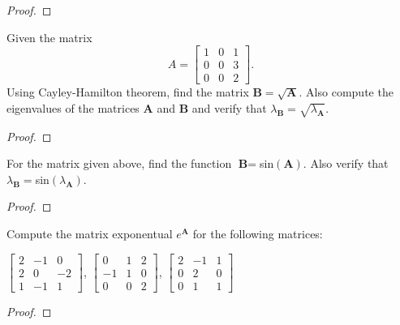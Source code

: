 \documentclass[conference,12pt,onecolumn,compsoc]{IEEEtran}
\begin{document}
\begin{exercise}

\end{exercise}
\begin{proof}

\end{proof}

\begin{exercise}
Given the matrix
\begin{equation}
A=\begin{bmatrix} 1 & 0 & 1 \\ 
0 & 0 & 3 \\
 0& 0 & 2  \end{bmatrix}.
\nonumber
\end{equation}
Using Cayley-Hamilton theorem, find the matrix $\textbf{B}=\sqrt{\textbf{A}}$. Also compute the eigenvalues of the matrices \textbf{A} and \textbf{B} and verify that $\lambda_\textbf{B} = \sqrt{\lambda_\textbf{A}}$.
\end{exercise}
\begin{proof}

\end{proof}

\begin{exercise}
For the matrix given above, find the function $\textbf{B} = $sin$(\textbf{A})$. Also verify that $\lambda_\textbf{B} = $sin$(\lambda_\textbf{A})$. 
\end{exercise}
\begin{proof}

\end{proof}

\begin{exercise}
Compute the matrix exponentual $e^\textbf{A}$ for the following matrices:
\begin{center}

$\begin{bmatrix} 2 & -1 & 0 \\ 
2 & 0 & -2 \\
 1 & -1 & 1  \end{bmatrix}$, $\begin{bmatrix} 0 & 1 & 2 \\ 
-1 & 1 & 0 \\
 0 & 0 & 2  \end{bmatrix}$, $\begin{bmatrix} 2 & -1 & 1 \\ 
0 & 2 & 0 \\
 0 & 1 & 1  \end{bmatrix}$
\end{center}
\end{exercise}
\begin{proof}

\end{proof}
\end{document}
